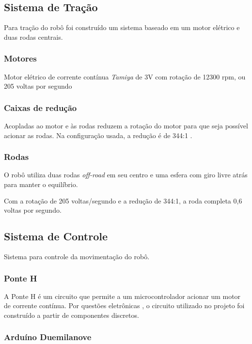 \subsection{Sistema de Tração}

Para tração do robô foi construído um sistema baseado em um motor elétrico e duas rodas centrais.

\subsubsection{Motores}
Motor elétrico de corrente contínua \textit{Tamiya} de 3V com rotação de 12300 rpm, ou 205 voltas por segundo \cite{RoboExplorador}

\subsubsection{Caixas de redução}
Acopladas ao motor e às rodas reduzem a rotação do motor para que seja possível acionar as rodas. Na configuração usada, a redução é de 344:1 \cite{RoboExplorador}.

\subsubsection{Rodas}
O robô utiliza duas rodas \textit{off-road} em seu centro e uma esfera com giro livre atrás para manter o equilíbrio.

Com a rotação de 205 voltas/segundo e a redução de 344:1, a roda completa 0,6 voltas por segundo.

\subsection{Sistema de Controle}

Sistema para controle da movimentação do robô.

\subsubsection{Ponte H} 

A Ponte H é um circuito que permite a um microcontrolador acionar um motor de corrente contínua. Por questões eletrônicas \cite{RoboExplorador}, o circuito utilizado no projeto foi construído a partir de componentes discretos.

\subsubsection{Arduíno Duemilanove}

